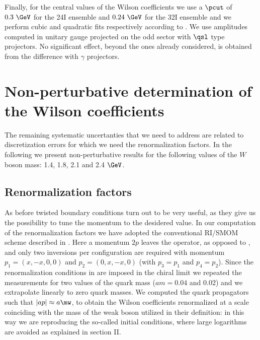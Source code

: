 \documentclass[aps,prd,twocolumn,nofootinbib,showpacs,superscriptaddress]{revtex4-1}
\begin{document}
Finally, for the central values of the Wilson coefficients
we use a $\pcut$ of $0.3~\GeV$ for the 24I ensemble and $0.24~\GeV$ for the 32I
ensemble and we perform cubic and quadratic fits respectively
according to . We use amplitudes computed in unitary
gauge projected on the odd sector with $\qsl$ type projectors.
No significant effect, beyond the ones already considered, is obtained
from the difference with $\gamma$ projectors.

\section{Non-perturbative determination of the Wilson coefficients}

The remaining systematic uncertanties that we need to address are
related to discretization errors for which we need the renormalization
factors. In the following we present non-perturbative results 
for the following values of the $W$ boson mass: 1.4, 1.8, 2.1 and 2.4 $\GeV$.

\subsection{Renormalization factors}

As before twisted boundary conditions turn out to be very useful, as 
they give us the possibility to tune the momentum to the desidered value.
In our computation of the renormalization factors we have adopted the conventional
RI/SMOM scheme described in .
Here a momentum $2p$ leaves the operator, as opposed to ,
and only two inversions per configuration are
required with momentum $p_1=(x,-x,0,0)$ and $p_2=(0,x,-x,0)$ (with $p_3=p_1$ and $p_4=p_2$).
Since the renormalization conditions in  are imposed in the chiral limit
we repeated the measurements for two values of the quark mass ($am=0.04$ and 0.02) 
and we extrapolate linearly to zero quark masses.
We computed the quark propagators such that $ |ap| \approx a \mw$, 
to obtain the Wilson coefficients renormalized at a scale coinciding with the mass of 
the weak boson utilized in their definition: in this way we are reproducing the 
so-called initial conditions, where large logarithms are avoided as explained in
section II.
\end{document}
